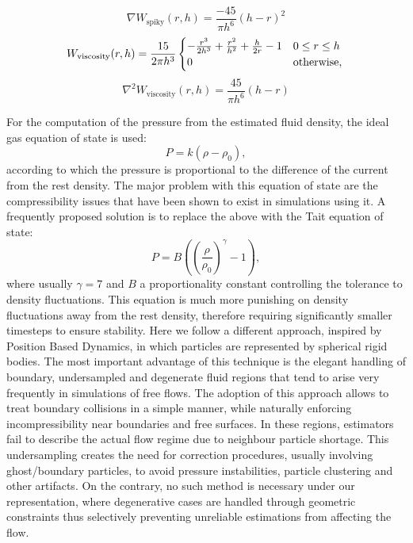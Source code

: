 \documentclass{llncs}
\begin{document}
\begin{equation*}
  \label{eq:spiky-gradient}
  \nabla W_{\text{spiky}}(r, h) = \frac{-45}{\pi h^6} (h-r)^2
\end{equation*}
\begin{equation}
  \label{eq:viscosity}
  W_{\text{viscosity}}(r, h) = \frac{15}{2 \pi h^3}
  \begin{cases}
    - \frac{r^3}{2h^3} + \frac{r^2}{h^2} + \frac{h}{2r} - 1 & 0 \leq r \leq h\\
    0 & \text{otherwise},
  \end{cases}\\
\end{equation}
\begin{equation*}
  \label{eq:viscosity-laplacian}
  \nabla^2 W_{\text{viscosity}}(r, h) = \frac{45}{\pi h^6} (h-r)
\end{equation*}

For the computation of the pressure from the estimated fluid density, the ideal gas
equation of state is used:
\begin{equation}
  \label{eq:ideal-state}
  P = k(\rho - \rho_0),
\end{equation}
according to which the pressure is proportional to the difference of the current from the
rest density. The major problem with this equation of state are the compressibility issues
that have been shown to exist in simulations using it. A frequently proposed solution is
to replace the above with the Tait equation of state:
\begin{equation}
  \label{eq:tait-state}
  P = B \left( \left( \frac{\rho}{\rho_0} \right)^\gamma - 1 \right),
\end{equation}
where usually $\gamma=7$ and $B$ a proportionality constant controlling the tolerance to
density fluctuations. This equation is much more punishing on density fluctuations away
from the rest density, therefore requiring significantly smaller timesteps to ensure
stability. Here we follow a different approach, inspired by Position Based Dynamics, in
which particles are represented by spherical rigid bodies. The most important advantage of
this technique is the elegant handling of boundary, undersampled and degenerate fluid
regions that tend to arise very frequently in simulations of free flows. The adoption of
this approach allows to treat boundary collisions in a simple manner, while naturally
enforcing incompressibility near boundaries and free surfaces. In these regions,
estimators fail to describe the actual flow regime due to neighbour particle
shortage. This undersampling creates the need for correction procedures, usually involving
ghost/boundary particles, to avoid pressure instabilities, particle clustering and other
artifacts. On the contrary, no such method is necessary under our representation, where
degenerative cases are handled through geometric constraints thus selectively preventing
unreliable estimations from affecting the flow.
\end{document}
